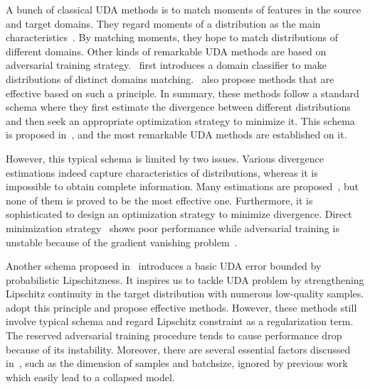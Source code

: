 \documentclass[10pt,twocolumn,letterpaper]{article}
\begin{document}
A bunch of classical UDA methods is to match moments of features in the source and target domains. They regard moments of a distribution as the main characteristics~\cite{zellinger2017central,sun2016deep,pmlr-v37-long15}. By matching moments, they hope to match distributions of different domains. Other kinds of remarkable UDA methods are based on adversarial training strategy.~\cite{ganin2016domain} first introduces a domain classifier to make distributions of distinct domains matching.~\cite{liu2016coupled,bousmalis2017unsupervised} also propose methods that are effective based on such a principle. In summary, these methods follow a standard schema where they first estimate the divergence between different distributions and then seek an appropriate optimization strategy to minimize it. This schema is proposed in~\cite{ben2010theory}, and the most remarkable UDA methods are established on it.

However, this typical schema is limited by two issues. Various divergence estimations indeed capture characteristics of distributions, whereas it is impossible to obtain complete information. Many estimations are proposed~\cite{ben2010theory,zellinger2017central,sun2016deep,pmlr-v37-long15}, but none of them is proved to be the most effective one. Furthermore, it is sophisticated to design an optimization strategy to minimize divergence. Direct minimization strategy~\cite{zellinger2017central,sun2016deep,pmlr-v37-long15} shows poor performance while adversarial training is unstable because of the gradient vanishing problem~\cite{8833506,arjovsky2017towards}.

Another schema proposed in~\cite{Ben-David2014} introduces a basic UDA error bounded by probabilistic Lipschitzness. It inspires us to tackle UDA problem by strengthening Lipschitz continuity in the target distribution with numerous low-quality samples. \cite{shu2018a, mao2019virtual} adopt this principle and propose effective methods. However, these methods still involve typical schema and regard Lipschitz constraint as a regularization term. The reserved adversarial training procedure tends to cause performance drop because of its instability. Moreover, there are several essential factors discussed in~\cite{Ben-David2014}, such as the dimension of samples and batchsize, ignored by previous work which easily lead to a collapsed model.
\end{document}
